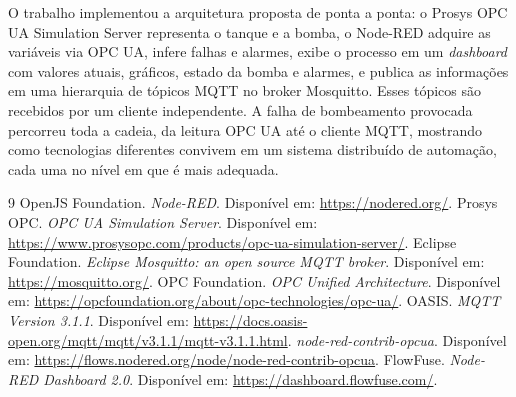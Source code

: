 \documentclass[11pt,a4paper]{article}
\begin{document}
O trabalho implementou a arquitetura proposta de ponta a ponta: o Prosys OPC
UA Simulation Server representa o tanque e a bomba, o Node-RED adquire as
variáveis via OPC UA, infere falhas e alarmes, exibe o processo em um
\emph{dashboard} com valores atuais, gráficos, estado da bomba e alarmes, e
publica as informações em uma hierarquia de tópicos MQTT no broker Mosquitto.
Esses tópicos são recebidos por um cliente independente. A falha de
bombeamento provocada percorreu toda a cadeia, da leitura OPC UA até o cliente
MQTT, mostrando como tecnologias diferentes convivem em um sistema distribuído
de automação, cada uma no nível em que é mais adequada.

{\small\raggedright
\begin{thebibliography}{9}\setlength{\itemsep}{1pt}
 OpenJS Foundation. \emph{Node-RED}. Disponível em: \url{https://nodered.org/}.
 Prosys OPC. \emph{OPC UA Simulation Server}. Disponível em: \url{https://www.prosysopc.com/products/opc-ua-simulation-server/}.
 Eclipse Foundation. \emph{Eclipse Mosquitto: an open source MQTT broker}. Disponível em: \url{https://mosquitto.org/}.
 OPC Foundation. \emph{OPC Unified Architecture}. Disponível em: \url{https://opcfoundation.org/about/opc-technologies/opc-ua/}.
 OASIS. \emph{MQTT Version 3.1.1}. Disponível em: \url{https://docs.oasis-open.org/mqtt/mqtt/v3.1.1/mqtt-v3.1.1.html}.
 \emph{node-red-contrib-opcua}. Disponível em: \url{https://flows.nodered.org/node/node-red-contrib-opcua}.
 FlowFuse. \emph{Node-RED Dashboard 2.0}. Disponível em: \url{https://dashboard.flowfuse.com/}.
\end{thebibliography}
}
\end{document}
